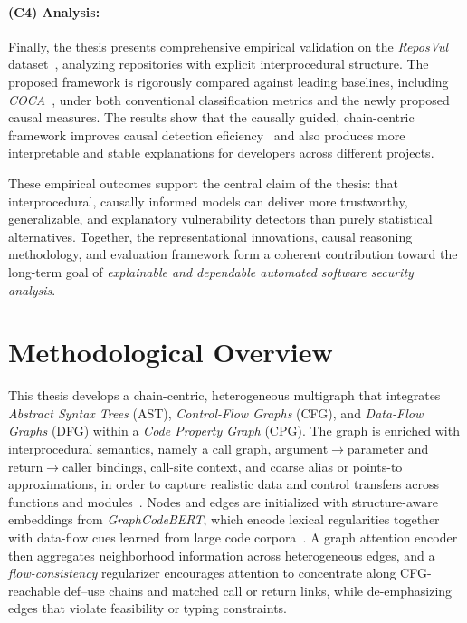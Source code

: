 \documentclass{buthesis}
\begin{document}
\paragraph{(C4) Analysis:}
Finally, the thesis presents comprehensive empirical validation on the \emph{ReposVul} dataset~\cite{wang2024reposvul}, analyzing repositories with explicit interprocedural structure. The proposed framework is rigorously compared against leading baselines, including \emph{COCA}~\cite{Cao2024ICSE}, under both conventional classification metrics and the newly proposed causal measures. The results show that the causally guided, chain-centric framework improves causal detection eficiency~\cite{Cao2024ASE,Kuang2024KSEM,Rahman2024ICSE} and also produces more interpretable and stable explanations for developers across different projects.

These empirical outcomes support the central claim of the thesis: that interprocedural, causally informed models can deliver more trustworthy, generalizable, and explanatory vulnerability detectors than purely statistical alternatives. Together, the representational innovations, causal reasoning methodology, and evaluation framework form a coherent contribution toward the long-term goal of \emph{explainable and dependable automated software security analysis}.


\section{Methodological Overview}
\label{sec:intro-method}

This thesis develops a chain-centric, heterogeneous multigraph that integrates \emph{Abstract Syntax Trees} (AST), \emph{Control-Flow Graphs} (CFG), and \emph{Data-Flow Graphs} (DFG) within a \emph{Code Property Graph} (CPG). The graph is enriched with interprocedural semantics, namely a call graph, argument$\rightarrow$parameter and return$\rightarrow$caller bindings, call-site context, and coarse alias or points-to approximations, in order to capture realistic data and control transfers across functions and modules~\cite{yagemann2021automated}. Nodes and edges are initialized with structure-aware embeddings from \emph{GraphCodeBERT}, which encode lexical regularities together with data-flow cues learned from large code corpora~\cite{guo2021graphcodebert}. A graph attention encoder then aggregates neighborhood information across heterogeneous edges, and a \emph{flow-consistency} regularizer encourages attention to concentrate along CFG-reachable def--use chains and matched call or return links, while de-emphasizing edges that violate feasibility or typing constraints.
\end{document}
